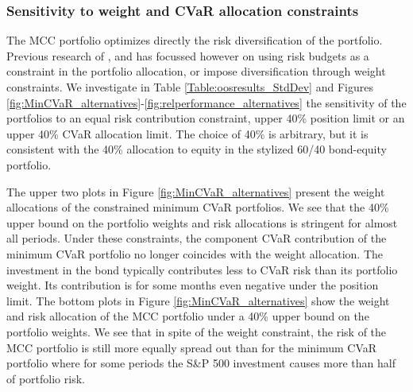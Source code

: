 \documentclass[12pt,a4paper]{article}
\begin{document}

\subsubsection{Sensitivity to weight and CVaR allocation constraints}


The MCC portfolio optimizes directly the risk diversification of the portfolio. Previous research of \citet{Maillard2010}, \citet{Qian2005} and \citet{Zhu2010} has focussed however on using risk budgets as a constraint in the portfolio allocation, or impose diversification through weight constraints.  We investigate in Table \ref{Table:oosresults_StdDev} and Figures \ref{fig:MinCVaR_alternatives}-\ref{fig:relperformance_alternatives} the sensitivity of the portfolios to an equal risk contribution constraint, upper 40\% position limit or an upper 40\% CVaR allocation limit. The choice of 40\% is arbitrary, but it is consistent with the 40\% allocation to equity in the stylized 60/40 bond-equity portfolio.





The upper two plots in Figure \ref{fig:MinCVaR_alternatives} present the weight allocations of the constrained minimum CVaR portfolios. We see that the 40\% upper bound on the portfolio weights and risk allocations is stringent for almost all periods. Under these constraints, the component CVaR contribution of the minimum CVaR portfolio no longer coincides with the weight allocation. The investment in the bond typically contributes less to CVaR risk than its portfolio weight. Its contribution is for some months even negative under the position limit. The bottom plots in Figure \ref{fig:MinCVaR_alternatives} show the weight and risk allocation of the MCC portfolio under a 40\% upper bound on the portfolio weights.  We see that in spite of the weight constraint, the risk of the MCC portfolio is still more equally spread out than for the minimum CVaR portfolio where for some periods the S\&P 500 investment causes more than half of portfolio risk.
\end{document}
